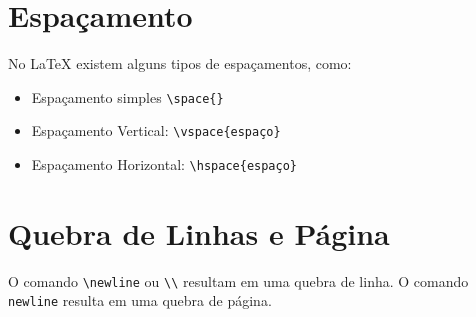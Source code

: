 \section{Espaçamento}

No LaTeX existem alguns tipos de espaçamentos, como: \\

 \begin{itemize}
    \item Espaçamento simples \verb|\space{}|
    \item Espaçamento Vertical: \verb|\vspace{espaço}|
    \item Espaçamento Horizontal: \verb|\hspace{espaço}|
\end{itemize}

\section{Quebra de Linhas e Página}

O comando \verb|\newline| ou \verb|\\| resultam em uma quebra de linha. 
O comando \verb|newline| resulta em uma quebra de página.

 

